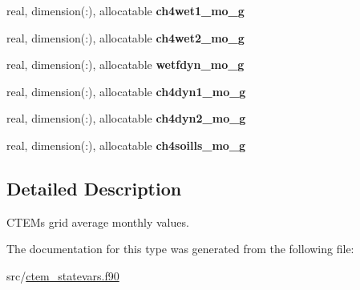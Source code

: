 \begin{DoxyCompactItemize}
\item 
\hypertarget{structctem__statevars_1_1ctem__gridavg__monthly_a2157a1f6aa3a8e84bd94776133ff43a4}{}real, dimension(\+:), allocatable {\bfseries ch4wet1\+\_\+mo\+\_\+g}\label{structctem__statevars_1_1ctem__gridavg__monthly_a2157a1f6aa3a8e84bd94776133ff43a4}

\item 
\hypertarget{structctem__statevars_1_1ctem__gridavg__monthly_aa20f28827b0823e33a27ed8080efd0e6}{}real, dimension(\+:), allocatable {\bfseries ch4wet2\+\_\+mo\+\_\+g}\label{structctem__statevars_1_1ctem__gridavg__monthly_aa20f28827b0823e33a27ed8080efd0e6}

\item 
\hypertarget{structctem__statevars_1_1ctem__gridavg__monthly_a2edef4fc7635c7c418d80fc1b80eb5c5}{}real, dimension(\+:), allocatable {\bfseries wetfdyn\+\_\+mo\+\_\+g}\label{structctem__statevars_1_1ctem__gridavg__monthly_a2edef4fc7635c7c418d80fc1b80eb5c5}

\item 
\hypertarget{structctem__statevars_1_1ctem__gridavg__monthly_a656766c932754093878af3fbbb25a28c}{}real, dimension(\+:), allocatable {\bfseries ch4dyn1\+\_\+mo\+\_\+g}\label{structctem__statevars_1_1ctem__gridavg__monthly_a656766c932754093878af3fbbb25a28c}

\item 
\hypertarget{structctem__statevars_1_1ctem__gridavg__monthly_a9eb9b6649323fc2f0a1b341c655e551c}{}real, dimension(\+:), allocatable {\bfseries ch4dyn2\+\_\+mo\+\_\+g}\label{structctem__statevars_1_1ctem__gridavg__monthly_a9eb9b6649323fc2f0a1b341c655e551c}

\item 
\hypertarget{structctem__statevars_1_1ctem__gridavg__monthly_a37626703e60feea0e35c5b9312825ef7}{}real, dimension(\+:), allocatable {\bfseries ch4soills\+\_\+mo\+\_\+g}\label{structctem__statevars_1_1ctem__gridavg__monthly_a37626703e60feea0e35c5b9312825ef7}

\end{DoxyCompactItemize}


\subsection{Detailed Description}
C\+T\+E\+M\textquotesingle{}s grid average monthly values. 

The documentation for this type was generated from the following file\+:\begin{DoxyCompactItemize}
\item 
src/\hyperlink{ctem__statevars_8f90}{ctem\+\_\+statevars.\+f90}\end{DoxyCompactItemize}
